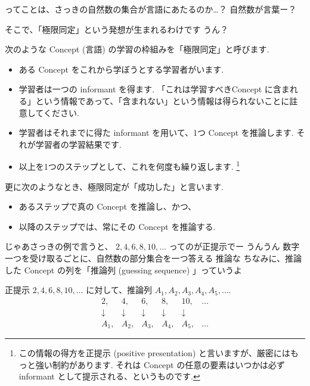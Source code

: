 \YUI ってことは、さっきの自然数の集合が言語にあたるのか…？
\YUKARI 自然数が言葉ー？

\PAUSE

\YUZUKO そこで、「極限同定」という発想が生まれるわけです
\YUI うん？

\begin{boxnote}
    次のような Concept (言語) の学習の枠組みを「極限同定」と呼びます.
    \begin{itemize}
        \setlength{\itemsep}{-1mm}
        \item
            ある Concept をこれから学ぼうとする学習者がいます.
        \item
            学習者は一つの informant を得ます. 「これは学習すべきConcept に含まれる」という情報であって、「含まれない」という情報は得られないことに註意してください.
        \item
            学習者はそれまでに得た informant を用いて、1つ Concept を推論します.
            それが学習者の学習結果です.
        \item
            以上を1つのステップとして、これを何度も繰り返します. \footnote{この情報の得方を正提示 (positive presentation) と言いますが、厳密にはもっと強い制約があります. それは Concept の任意の要素はいつかは必ず informant として提示される、というものです.}
    \end{itemize}

    更に次のようなとき、極限同定が「成功した」と言います.
    \begin{itemize}
        \setlength{\itemsep}{-1mm}
        \item
            あるステップで真の Concept を推論し、かつ、
        \item
            以降のステップでは、常にその Concept を推論する.
    \end{itemize}
\end{boxnote}

\YUKARI じゃあさっきの例で言うと、
\YUKARI $2, 4, 6, 8, 10, \ldots$ ってのが正提示でー
\YUI うんうん
\YUKARI 数字一つを受け取るごとに、自然数の部分集合を一つ答える
\YUI 推論な
\YUZUKO ちなみに、推論した Concept の列を「推論列 (guessing sequence) 」っていうよ

\begin{boxnote}
    正提示 $2, 4, 6, 8, 10, \ldots$ に対して、推論列 $A_1, A_2, A_3, A_4, A_5, \ldots$.
\[
    \begin{array}{cccccc}
        2, & 4, & 6, & 8, & 10, & \ldots \\
        \downarrow & \downarrow & \downarrow & \downarrow & \downarrow & \\
        A_1, & A_2, & A_3, & A_4, & A_5, & \ldots
    \end{array}
\]
\end{boxnote}

